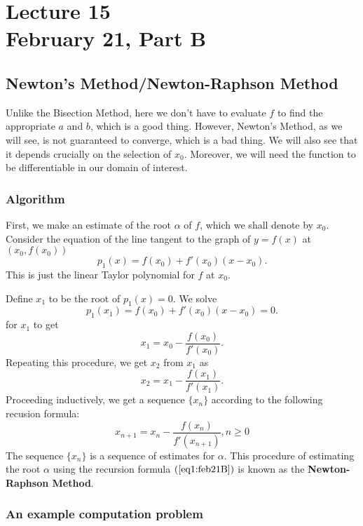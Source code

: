 \chapter*{Lecture 15 \\ February 21, Part B}
\setcounter{chapter}{15}
\setcounter{section}{0}

\section{Newton's Method/Newton-Raphson Method}

Unlike the Bisection Method, here we don't have to evaluate $f$ to find the appropriate  $a$ and  $b$, which is a good thing. However, Newton's Method, as we will see, is not guaranteed to converge, which is a bad thing. We will also see that it depends crucially on the selection of $x_0$. Moreover, we will need the function to be differentiable in our domain of interest.

\subsection{Algorithm}
First, we make an estimate of the root $\alpha$ of $f$, which we shall denote by  $ x_0$.
Consider the equation of the line tangent to the graph of $y = f(x)$ at $(x_0, f(x_0))$
\[
p_1(x) = f(x_0) + f'(x_0)\left( x-x_0 \right)   
.\] 
This is just the linear Taylor polynomial for $f$ at  $ x_0$.

Define $ x_1$ to be the root of $ p_1(x) = 0$. We solve 
\[
p_1(x_1) = f(x_0) + f'(x_0)(x-x_0) = 0
.\] 
for $ x_1$ to get 
\[
x_1 = x_0 - \frac{f(x_0)}{f'(x_0)}
.\] 
Repeating this procedure, we get $ x_2$ from $ x_1$ as 
\[
x_2 = x_1 - \frac{f(x_1)}{f'(x_1)}
.\] 
Proceeding inductively, we get a sequence $\{x_n\}$ according to the following recusion formula:
\begin{equation}\label{eq1:feb21B}
	 x_{n+1} = x_n - \frac{f(x_n)}{f'(x_{n+1})}, n \geq 0
\end{equation}
The sequence $\{x_n\}$ is a sequence of estimates for  $\alpha$. This procedure of estimating the root $\alpha$ using the recursion formula $\left( \ref{eq1:feb21B} \right) $ is known as the \textbf{Newton-Raphson Method}.
\newpage

\subsection{An example computation problem}

